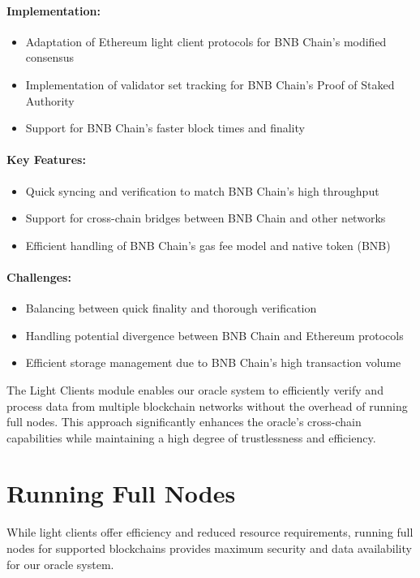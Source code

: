 \documentclass[12pt,a4paper]{article}
\begin{document}
	\paragraph{Implementation:}
	\begin{itemize}
		\item Adaptation of Ethereum light client protocols for BNB Chain's modified consensus
		\item Implementation of validator set tracking for BNB Chain's Proof of Staked Authority
		\item Support for BNB Chain's faster block times and finality
	\end{itemize}
	
	\paragraph{Key Features:}
	\begin{itemize}
		\item Quick syncing and verification to match BNB Chain's high throughput
		\item Support for cross-chain bridges between BNB Chain and other networks
		\item Efficient handling of BNB Chain's gas fee model and native token (BNB)
	\end{itemize}
	
	\paragraph{Challenges:}
	\begin{itemize}
		\item Balancing between quick finality and thorough verification
		\item Handling potential divergence between BNB Chain and Ethereum protocols
		\item Efficient storage management due to BNB Chain's high transaction volume
	\end{itemize}
	
	The Light Clients module enables our oracle system to efficiently verify and process data from multiple blockchain networks without the overhead of running full nodes. This approach significantly enhances the oracle's cross-chain capabilities while maintaining a high degree of trustlessness and efficiency.
	
	\section{Running Full Nodes}
	While light clients offer efficiency and reduced resource requirements, running full nodes for supported blockchains provides maximum security and data availability for our oracle system.
	
\end{document}
